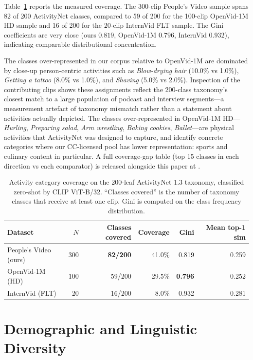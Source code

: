 \documentclass{article}
\begin{document}
Table~\ref{tab:activity_coverage} reports the measured coverage. The 300-clip People's Video sample spans 82 of 200 ActivityNet classes, compared to 59 of 200 for the 100-clip OpenVid-1M HD sample and 16 of 200 for the 20-clip InternVid FLT sample. The Gini coefficients are very close (ours $0.819$, OpenVid-1M $0.796$, InternVid $0.932$), indicating comparable distributional concentration.

The classes over-represented in our corpus relative to OpenVid-1M are dominated by close-up person-centric activities such as \textit{Blow-drying hair} (10.0\% vs 1.0\%), \textit{Getting a tattoo} (8.0\% vs 1.0\%), and \textit{Shaving} (5.0\% vs 2.0\%). Inspection of the contributing clips shows these assignments reflect the 200-class taxonomy's closest match to a large population of podcast and interview segments---a measurement artefact of taxonomy mismatch rather than a statement about activities actually depicted. The classes over-represented in OpenVid-1M HD---\textit{Hurling}, \textit{Preparing salad}, \textit{Arm wrestling}, \textit{Baking cookies}, \textit{Ballet}---are physical activities that ActivityNet was designed to capture, and identify concrete categories where our CC-licensed pool has lower representation: sports and culinary content in particular. A full coverage-gap table (top 15 classes in each direction vs each comparator) is released alongside this paper at .

\begin{table}[t]
\centering
\caption{Activity category coverage on the 200-leaf ActivityNet 1.3 taxonomy, classified zero-shot by CLIP ViT-B/32. ``Classes covered'' is the number of taxonomy classes that receive at least one clip. Gini is computed on the class frequency distribution.}
\label{tab:activity_coverage}
\begin{tabular}{lrrrrr}
\toprule
Dataset & $N$ & Classes covered & Coverage & Gini & Mean top-1 sim \\
\midrule
People's Video (ours) & 300 & \textbf{82/200} & 41.0\% & 0.819 & 0.259 \\
OpenVid-1M (HD)       & 100 & 59/200 & 29.5\% & \textbf{0.796} & 0.252 \\
InternVid (FLT)       & 20  & 16/200 & \phantom{0}8.0\%  & 0.932 & 0.281 \\
\bottomrule
\end{tabular}
\end{table}

\section{Demographic and Linguistic Diversity}
\label{app:diversity}
\end{document}
